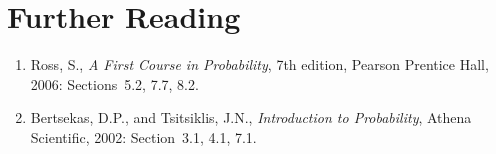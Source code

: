 %


\section*{Further Reading}

\begin{small}
\begin{enumerate}
\item Ross, S., \emph{A First Course in Probability}, 7th edition, Pearson Prentice Hall, 2006: Sections~5.2, 7.7, 8.2.
\item Bertsekas, D.P., and Tsitsiklis, J.N., \emph{Introduction to Probability}, Athena Scientific, 2002: Section~3.1, 4.1, 7.1.
\end{enumerate}
\end{small}

